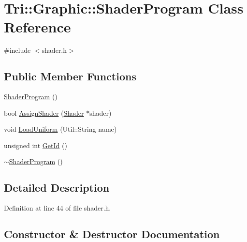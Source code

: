 \hypertarget{class_tri_1_1_graphic_1_1_shader_program}{}\section{Tri\+:\+:Graphic\+:\+:Shader\+Program Class Reference}
\label{class_tri_1_1_graphic_1_1_shader_program}


{\ttfamily \#include $<$shader.\+h$>$}

\subsection*{Public Member Functions}
\begin{DoxyCompactItemize}
\item 
\hyperlink{class_tri_1_1_graphic_1_1_shader_program_acee0f1e112a1dddbdcda4e640c32eea5}{Shader\+Program} ()
\item 
bool \hyperlink{class_tri_1_1_graphic_1_1_shader_program_a8712f06282104ecd3bf25faa915c9e9d}{Assign\+Shader} (\hyperlink{class_tri_1_1_graphic_1_1_shader}{Shader} $\ast$shader)
\item 
void \hyperlink{class_tri_1_1_graphic_1_1_shader_program_a8661a9f4836c4783e101a8333d0d537e}{Load\+Uniform} (Util\+::\+String name)
\item 
unsigned int \hyperlink{class_tri_1_1_graphic_1_1_shader_program_afc4dd0cd5b38396039b2ceec84e841ae}{Get\+Id} ()
\item 
\hyperlink{class_tri_1_1_graphic_1_1_shader_program_a5042c8137c4e543c26163b934e122392}{$\sim$\+Shader\+Program} ()
\end{DoxyCompactItemize}


\subsection{Detailed Description}


Definition at line 44 of file shader.\+h.



\subsection{Constructor \& Destructor Documentation}
\hypertarget{class_tri_1_1_graphic_1_1_shader_program_acee0f1e112a1dddbdcda4e640c32eea5}{}
